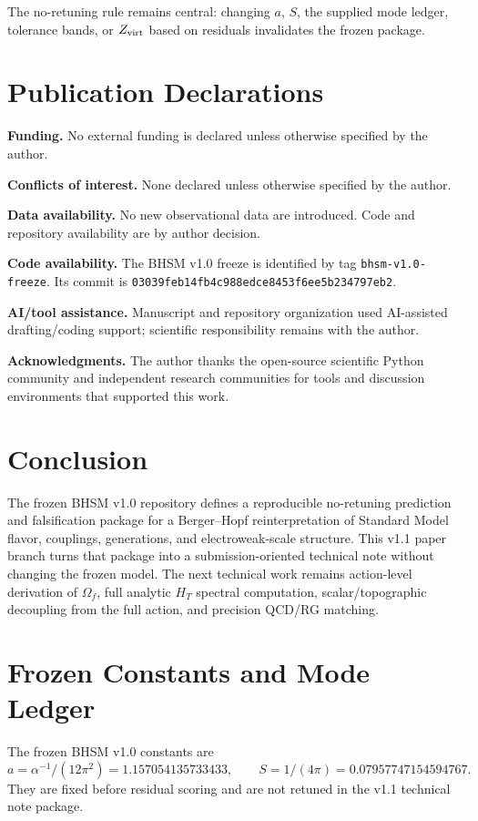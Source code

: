 \documentclass[11pt]{article}
\newcommand{\BHSM}{BHSM}
\newcommand{\HT}{\ensuremath{H_T}}
\newcommand{\CommitHash}{\texttt{03039feb14fb4c988edce}\allowbreak\texttt{8453f6ee5b234797eb2}}
\begin{document}
The no-retuning rule remains central: changing $a$, $S$, the supplied mode
ledger, tolerance bands, or $Z_{\rm virt}$ based on residuals invalidates the
frozen package.

\section{Publication Declarations}

\textbf{Funding.} No external funding is declared unless otherwise specified by
the author.

\textbf{Conflicts of interest.} None declared unless otherwise specified by the
author.

\textbf{Data availability.} No new observational data are introduced. Code and
repository availability are by author decision.

\textbf{Code availability.} The \BHSM{} v1.0 freeze is identified by tag
\texttt{bhsm-v1.0-freeze}. Its commit is \CommitHash{}.

\textbf{AI/tool assistance.} Manuscript and repository organization used
AI-assisted drafting/coding support; scientific responsibility remains with the
author.

\textbf{Acknowledgments.} The author thanks the open-source scientific Python
community and independent research communities for tools and discussion
environments that supported this work.

\section{Conclusion}

The frozen \BHSM{} v1.0 repository defines a reproducible no-retuning
prediction and falsification package for a Berger--Hopf reinterpretation of
Standard Model flavor, couplings, generations, and electroweak-scale structure.
This v1.1 paper branch turns that package into a submission-oriented technical
note without changing the frozen model. The next technical work remains
action-level derivation of $\Omega_f$, full analytic \HT{} spectral
computation, scalar/topographic decoupling from the full action, and precision
QCD/RG matching.

\appendix

\section{Frozen Constants and Mode Ledger}

The frozen BHSM v1.0 constants are
\[
  a=\alpha^{-1}/(12\pi^2)=1.157054135733433,\qquad
  S=1/(4\pi)=0.07957747154594767.
\]
They are fixed before residual scoring and are not retuned in the v1.1
technical note package.
\end{document}
